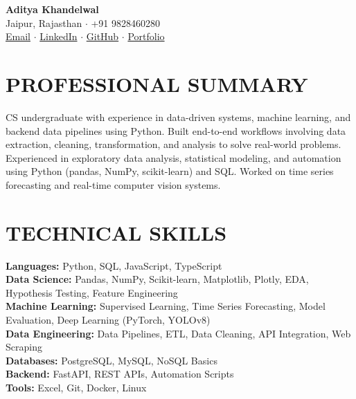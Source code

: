 \documentclass[11pt,letterpaper]{article}
\newcommand{\skill}[2]{\textbf{#1:} #2 \\}
\begin{document}
\begin{center}
    {\huge \textbf{Aditya Khandelwal}} \\
    \vspace{5pt}
    Jaipur, Rajasthan $\cdot$ +91 9828460280 \\
    \href{mailto:adityakhandelwal0271@gmail.com}{Email} $\cdot$
    \href{https://www.linkedin.com/in/nvmaditya/}{LinkedIn} $\cdot$
    \href{https://github.com/nvmaditya}{GitHub} $\cdot$
    \href{https://theadityakhandelwal.in/}{Portfolio}
\end{center}

\section{PROFESSIONAL SUMMARY}
CS undergraduate with experience in data-driven systems, machine learning, and backend data pipelines using Python. Built end-to-end workflows involving data extraction, cleaning, transformation, and analysis to solve real-world problems. Experienced in exploratory data analysis, statistical modeling, and automation using Python (pandas, NumPy, scikit-learn) and SQL. Worked on time series forecasting and real-time computer vision systems.

\section{TECHNICAL SKILLS}
\skill{Languages}{Python, SQL, JavaScript, TypeScript}
\skill{Data Science}{Pandas, NumPy, Scikit-learn, Matplotlib, Plotly, EDA, Hypothesis Testing, Feature Engineering}
\skill{Machine Learning}{Supervised Learning, Time Series Forecasting, Model Evaluation, Deep Learning (PyTorch, YOLOv8)}
\skill{Data Engineering}{Data Pipelines, ETL, Data Cleaning, API Integration, Web Scraping}
\skill{Databases}{PostgreSQL, MySQL, NoSQL Basics}
\skill{Backend}{FastAPI, REST APIs, Automation Scripts}
\skill{Tools}{Excel, Git, Docker, Linux}
\end{document}
